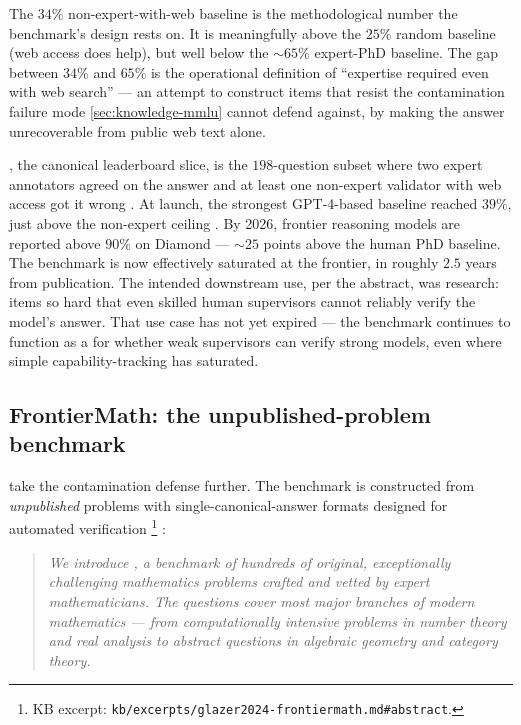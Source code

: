 The $34\%$ non-expert-with-web baseline is the methodological
number the benchmark's design rests on. It is meaningfully above the $25\%$ random
baseline (web access does help), but well below the $\sim 65\%$
expert-PhD baseline. The gap between $34\%$ and $65\%$ is the operational
definition of ``expertise required even with web search'' --- an
attempt to construct items that resist the contamination failure mode
\cref{sec:knowledge-mmlu} cannot defend against, by making the answer
unrecoverable from public web text alone.

, the canonical leaderboard slice, is the $198$-question
subset where two expert annotators agreed on the answer and at least
one non-expert validator with web access got it wrong
\citep[\S{}sec-diamond]{rein2023-gpqa}. At launch, the strongest
GPT-4-based baseline reached $39\%$, just above the non-expert ceiling
\citep[\S{}sec-ai-baseline]{rein2023-gpqa}. By 2026, frontier reasoning
models are reported above $90\%$ on Diamond --- $\sim 25$ points above
the human PhD baseline. The benchmark is now effectively saturated at
the frontier, in roughly $2.5$ years from publication. The intended
downstream use, per the abstract, was  research:
items so hard that even skilled human supervisors cannot reliably
verify the model's answer. That use case has not yet expired ---
the benchmark continues to function as a  for whether weak
supervisors can verify strong models, even where simple
capability-tracking has saturated.

\subsection{FrontierMath: the unpublished-problem benchmark}
\label{sec:knowledge-frontiermath}

\citet{glazer2024-frontiermath} take the contamination defense further.
The benchmark is constructed from \emph{unpublished} problems with
single-canonical-answer formats designed for automated verification%
\footnote{KB excerpt: \nolinkurl{kb/excerpts/glazer2024-frontiermath.md#abstract}.}
\citep[\S{}abstract]{glazer2024-frontiermath}:

\begin{quote}\itshape
We introduce , a benchmark of hundreds of original,
exceptionally challenging mathematics problems crafted and vetted by
expert mathematicians. The questions cover most major branches of
modern mathematics --- from computationally intensive problems in
number theory and real analysis to abstract questions in algebraic
geometry and category theory.
\end{quote}

